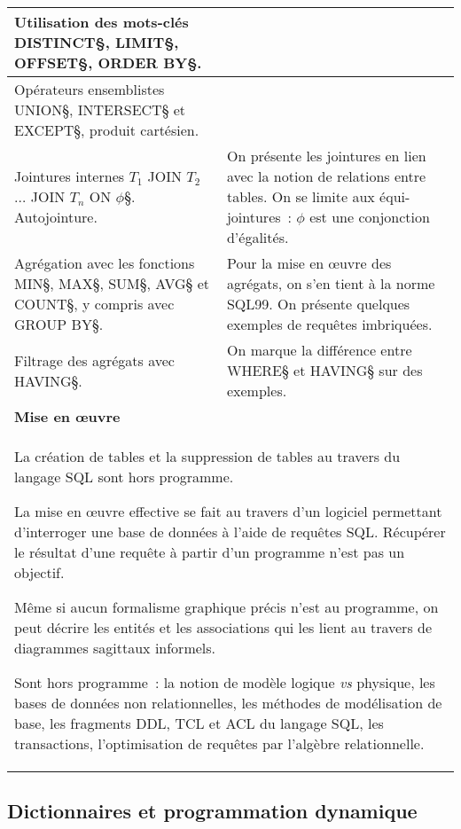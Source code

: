 \begin{longtable}{|p{\lnotion}|p{\comment}|}
    Utilisation des mots-clés \§DISTINCT§, \§LIMIT§, \§OFFSET§, \§ORDER BY§. &
   \\ \hline
    Opérateurs ensemblistes \§UNION§, \§INTERSECT§ et \§EXCEPT§, produit cartésien. & \\ \hline
    Jointures internes \§$T_1$ JOIN $T_2$ $\dots$ JOIN $T_n$ ON $\phi$§. Autojointure. &
    On présente les jointures en lien avec la notion de relations entre
    tables. On se limite aux équi-jointures~: $\phi$ est une conjonction d'égalités. \\ \hline

    Agrégation avec les fonctions \§MIN§, \§MAX§, \§SUM§,
    \§AVG§ et \§COUNT§, y compris avec \§GROUP BY§. & 
    Pour la mise en \oe uvre des agrégats, on s'en tient à la norme SQL99. 
    On présente quelques exemples de requêtes imbriquées.
    \\ \hline
    Filtrage des agrégats avec \§HAVING§. & 
    On marque la différence entre \§WHERE§ et \§HAVING§ sur des exemples.\\

    \hline \hline
    \multicolumn{2}{|p{\lmoe}|}{\textbf{Mise en \oe uvre}} \\
    \hline
    \multicolumn{2}{|p{\lmoe}|}{
        La création de tables et la suppression de tables au travers du langage
        SQL sont hors programme. 
        
        La mise en œuvre effective se fait au
        travers d'un logiciel permettant d'interroger une base de données à
        l'aide de requêtes SQL. Récupérer le résultat d'une requête à partir
        d'un programme n'est pas un objectif. 

        Même si aucun formalisme graphique précis n'est au programme, 
        on peut décrire
        les entités et les associations qui les lient au travers de
        diagrammes sagittaux informels.
        
        Sont hors programme~: la notion de modèle logique \textit{vs} physique, les bases de données non relationnelles, les méthodes de modélisation de base,
        les fragments DDL, TCL et ACL du langage SQL, les transactions, l'optimisation de requêtes par l'algèbre relationnelle.
        } \\
        \hline
    
\end{longtable}

\clearpage

\subsection{Dictionnaires et programmation dynamique}

